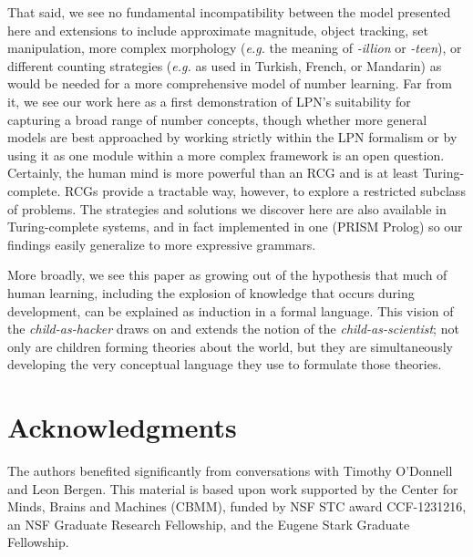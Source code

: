 \documentclass[10pt,letterpaper]{article}
\begin{document}
That said, we see no fundamental incompatibility between the model
presented here and extensions to include approximate magnitude, object
tracking, set manipulation, more complex morphology ({\it e.g.} the
meaning of \emph{-illion} or \emph{-teen}), or different counting
strategies ({\it e.g.} as used in Turkish, French, or Mandarin) as
would be needed for a more comprehensive model of number learning. Far
from it, we see our work here as a first demonstration of LPN's
suitability for capturing a broad range of number concepts, though
whether more general models are best approached by working strictly
within the LPN formalism or by using it as one module within a more
complex framework is an open question. Certainly, the human mind is
more powerful than an RCG and is at least Turing-complete. RCGs
provide a tractable way, however, to explore a restricted subclass of
problems. The strategies and solutions we discover here are also
available in Turing-complete systems, and in fact implemented in one
(PRISM Prolog) so our findings easily generalize to more expressive
grammars.

More broadly, we see this paper as growing out of the hypothesis that
much of human learning, including the explosion of knowledge that
occurs during development, can be explained as induction in a formal
language. This vision of the \emph{child-as-hacker} draws on and
extends the notion of the \emph{child-as-scientist}; not only are
children forming theories about the world, but they are simultaneously
developing the very conceptual language they use to formulate those
theories.


\section{Acknowledgments}

The authors benefited significantly from conversations with Timothy
O'Donnell and Leon Bergen. This material is based upon work supported
by the Center for Minds, Brains and Machines (CBMM), funded by NSF STC
award CCF-1231216, an NSF Graduate Research Fellowship, and the Eugene
Stark Graduate Fellowship.




\setlength{\bibleftmargin}{.125in}
\setlength{\bibindent}{-\bibleftmargin}

\end{document}
